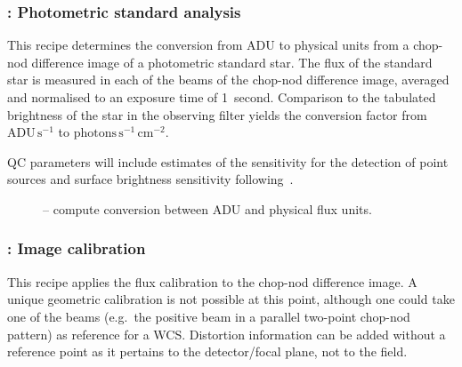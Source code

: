 \clearpage
\subsubsection{:  Photometric standard analysis}
\label{n_img_std_process}
\label{rec:n_img_std_process}
\label{ssec:n_img_std_process}
\label{sssec:n_img_std_process}
\label{metis_n_img_std_process}
\label{rec:metis_n_img_std_process}
\label{sssec:metis_n_img_std_process}

This recipe determines the conversion from ADU to physical units from
a chop-nod difference image of a photometric standard star.  The flux
of the standard star is measured in each of the beams of the chop-nod
difference image, averaged and normalised to an exposure time of
1~second. Comparison to the tabulated brightness of the star in the
observing filter yields the conversion factor from
$\mathrm{ADU}\,\mathrm{s}^{-1}$ to
$\mathrm{photons}\,\mathrm{s}^{-1}\,\mathrm{cm}^{-2}$.

QC parameters will include estimates of the sensitivity for the
detection of point sources and surface brightness sensitivity
following~\cite{visir_manual}.



\begin{figure}[hb]
    \centering
    \def \globalscale {0.700000}
    \fontsize{10}{12}\selectfont
    
  \caption[Recipe: ]{ --
    compute conversion between ADU and physical flux units.}
  \label{fig:metis_n_img_std_process}
\end{figure}


\clearpage

\subsubsection{:  Image calibration}
\label{n_img_calibrate}
\label{rec:n_img_calibrate}
\label{sssec:n_img_calibrate}
\label{rec:metis_n_img_calibrate}

This recipe applies the flux calibration to the chop-nod difference
image. A unique geometric calibration is not possible at this point,
although one could take one of the beams (e.g.\ the positive beam in a
parallel two-point chop-nod pattern) as reference for a
WCS. Distortion information can be added without a reference point as
it pertains to the detector/focal plane, not to the field.

